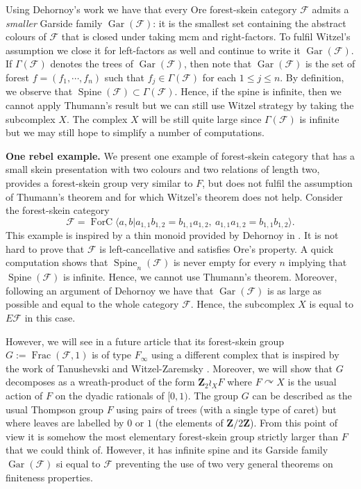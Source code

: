 \documentclass[a4paper, 12pt]{amsart}
\numberwithin{equation}{section}
\theoremstyle{definition}
\newcommand{\act}{\curvearrowright}
\newcommand{\cF}{\mathcal F}
\DeclareMathOperator{\Frac}{Frac}
\DeclareMathOperator{\FC}{ForC}
\newcommand{\Ga}{\Gamma}
\DeclareMathOperator{\Gar}{Gar}
\DeclareMathOperator{\Sp}{Spine}
\newcommand{\Z}{\mathbf{Z}}
\begin{document}
Using Dehornoy's work we have that every Ore forest-skein category $\cF$ admits a {\it smaller} Garside family $\Gar(\cF)$: it is the smallest set containing the abstract colours of $\cF$ that is closed under taking mcm and right-factors. 
To fulfil Witzel's assumption we close it for left-factors as well and continue to write it $\Gar(\cF).$
If $\Ga(\cF)$ denotes the trees of $\Gar(\cF)$, then note that $\Gar(\cF)$ is the set of forest $f=(f_1,\cdots,f_n)$ such that $f_j\in \Ga(\cF)$ for each $1\leq j\leq n.$
By definition, we observe that $\Sp(\cF)\subset \Ga(\cF)$. 
Hence, if the spine is infinite, then we cannot apply Thumann's result but we can still use Witzel strategy by taking the subcomplex $X$.
The complex $X$ will be still quite large since $\Ga(\cF)$ is infinite but we may still hope to simplify a number of computations.

{\bf One rebel example.}
We present one example of forest-skein category that has a small skein presentation with two colours and two relations of length two, provides a forest-skein group very similar to $F$, but does not fulfil the assumption of Thumann's theorem and for which Witzel's theorem does not help.
Consider the forest-skein category $$\cF=\FC\langle a,b| a_{1,1}b_{1,2} = b_{1,1} a_{1,2}, \ a_{1,1}a_{1,2}=b_{1,1}b_{1,2}\rangle.$$
This example is inspired by a thin monoid provided by Dehornoy in \cite[Example 4.4]{Dehornoy02}.
It is not hard to prove that $\cF$ is left-cancellative and satisfies Ore's property.
A quick computation shows that $\Sp_n(\cF)$ is never empty for every $n$ implying that $\Sp(\cF)$ is infinite.
Hence, we cannot use Thumann's theorem.
Moreover, following an argument of Dehornoy we have that $\Gar(\cF)$ is as large as possible and equal to the whole category $\cF$. Hence, the subcomplex $X$ is equal to $E\cF$ in this case.

However, we will see in a future article that its forest-skein group $G:=\Frac(\cF,1)$ is of type $F_\infty$ using a different complex that is inspired by the work of Tanushevski and Witzel-Zaremsky \cite{Tanushevski16,Witzel-Zaremsky18}.
Moreover, we will show that $G$ decomposes as a wreath-product of the form $\Z_2\wr_X F$ where $F\act X$ is the usual action of $F$ on the dyadic rationals of $[0,1)$. 
The group $G$ can be described as the usual Thompson group $F$ using pairs of trees (with a single type of caret) but where leaves are labelled by $0$ or $1$ (the elements of $\Z/2\Z$). 
From this point of view it is somehow the most elementary forest-skein group strictly larger than $F$ that we could think of.
However, it has infinite spine and its Garside family $\Gar(\cF)$ si equal to $\cF$ preventing the use of two very general theorems on finiteness properties.
\end{document}
